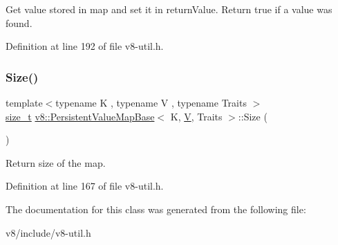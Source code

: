 Get value stored in map and set it in return\+Value. Return true if a value was found. 

Definition at line 192 of file v8-\/util.\+h.

\mbox{\label{classv8_1_1PersistentValueMapBase_ade5c5db2a968fdabe073649e85b837eb}} 
\subsubsection{\texorpdfstring{Size()}{Size()}}
{\footnotesize\ttfamily template$<$typename K , typename V , typename Traits $>$ \\
\mbox{\hyperlink{classsize__t}{size\+\_\+t}} \mbox{\hyperlink{classv8_1_1PersistentValueMapBase}{v8\+::\+Persistent\+Value\+Map\+Base}}$<$ K, \mbox{\hyperlink{classV}{V}}, Traits $>$\+::Size (\begin{DoxyParamCaption}{ }\end{DoxyParamCaption})\hspace{0.3cm}{\ttfamily [inline]}}

Return size of the map. 

Definition at line 167 of file v8-\/util.\+h.



The documentation for this class was generated from the following file\+:\begin{DoxyCompactItemize}
\item 
v8/include/v8-\/util.\+h\end{DoxyCompactItemize}

